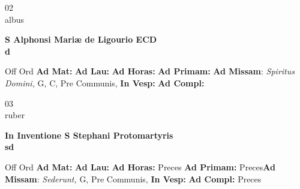 \documentclass[10pt, openany]{book}
\begin{document}
    \begin{center}
        \begin{minipage}{3.5in}
            \vspace{2em}
            \begin{minipage}{0.5in}
                {\Huge 02} \\
                {\normalsize albus}
            \end{minipage}
            \begin{minipage}{3.0in}
                \textbf{ \large S Alphonsi Mariæ de Ligourio ECD \\
                \textnormal{\normalsize d}}

            \end{minipage}
            \begin{justify}Off Ord
                \textbf{Ad Mat: }
                \textbf{Ad Lau: }
                \textbf{Ad Horas: }
                \textbf{Ad Primam: }\textbf{Ad Missam}: \textit{Spiritus Domini,} G, C, Pre Communis, 
                \textbf{In Vesp: }
                \textbf{Ad Compl: }
            \end{justify}
        \end{minipage}
    \end{center}

    \begin{center}
        \begin{minipage}{3.5in}
            \vspace{2em}
            \begin{minipage}{0.5in}
                {\Huge 03} \\
                {\normalsize ruber}
            \end{minipage}
            \begin{minipage}{3.0in}
                \textbf{ \large In Inventione S Stephani Protomartyris \\
                \textnormal{\normalsize sd}}

            \end{minipage}
            \begin{justify}Off Ord
                \textbf{Ad Mat: }
                \textbf{Ad Lau: }
                \textbf{Ad Horas: }Preces
                \textbf{Ad Primam: }Preces\textbf{Ad Missam}: \textit{Sederunt,} G, Pre Communis, 
                \textbf{In Vesp: }
                \textbf{Ad Compl: }Preces
            \end{justify}
        \end{minipage}
    \end{center}
\end{document}
